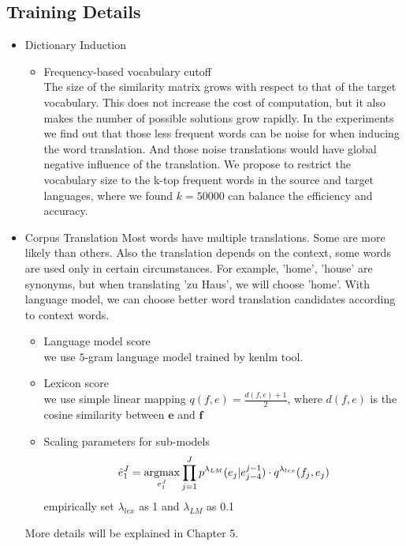 \subsection{Training Details}
\begin{itemize}
	\item Dictionary Induction
	\begin{itemize}
		 With cross-lingual word embeddings, we can directly find the word translation using nearest neighbors search. The nearest neighbor suffers from the hubness problem. As mentioned in Section 3.4, we adopt the Cross-domain Similarity Local Scaling (CSLS) from \cite{conneau2017word}. Following the authors, we set $k=10$.
		 \item Frequency-based vocabulary cutoff\\
		 The size of the similarity matrix grows with respect to that of the target vocabulary. This does not increase the cost of computation, but it also makes the number of possible solutions grow rapidly. In the experiments we find out that those less frequent words can be noise for when inducing the word translation. And those noise translations would have global negative influence of the translation.
		 We propose to restrict the vocabulary size to the k-top frequent words in the source and target languages, where we found $k=50000$ can balance the efficiency and accuracy.	 
	\end{itemize}


	\item Corpus Translation
	Most words have multiple translations. Some are more likely than others. Also the translation depends on the context, some words are used only in certain circumstances. For example, 'home', 'house' are synonyms, but when translating 'zu Haus', we will choose 'home'.  With language model, we can choose better word translation candidates according to context words. 
	\begin{itemize}
		\item Language model score \\we use $5$-gram language model trained by kenlm tool.
		\item Lexicon score\\ we use simple linear mapping $q(f,e) = \frac{d(f,e)+1}{2}$, where $d(f,e)$ is the cosine similarity between $\bm{e}$ and $\bm{f}$	
		\item Scaling parameters for sub-models\\ 
		\[ \hat{e}_1^J = \underset{e_1^J}{\operatorname{argmax}} \prod_{j=1}^{J} p^{\lambda_{LM}}(e_j| e_{j-4}^{j-1}) \cdot q^{\lambda_{lex}}(f_j, e_j)\]
		empirically set $\lambda_{lex}$ as 1 and  $\lambda_{LM}$ as 0.1
	\end{itemize}
	More details will be explained in Chapter 5.
	




\end{itemize}
